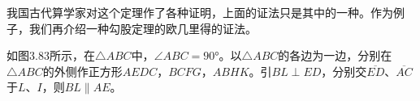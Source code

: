\begin{figure}
    \begin{minipage}[t]{0.38\linewidth}
    \centering
\begin{tikzpicture}[>=latex, scale=1]

    \end{tikzpicture}
    \caption{}
    \end{minipage}
    \begin{minipage}[t]{0.58\linewidth}
    \centering
    \begin{tikzpicture}[>=latex, scale=1]
    \end{tikzpicture}
    \caption{}
    \end{minipage}
    \end{figure}

我国古代算学家对这个定理作了各种证明，上面的证法只是其中的一种。作为例子，我们再介绍一种勾股定理的欧几里得的证法。


如图3.83所示，在$\triangle ABC$中，$\angle ABC=\ang{90}$。以$\triangle ABC$的各边为一边，分别在$\triangle ABC$的外侧作正方形$AEDC$，$BCFG$，$ABHK$。引$BL\perp ED$，分别交$\overline{ED}$、$\overline{AC}$于$L$、$I$，则$BL\parallel AE$。


